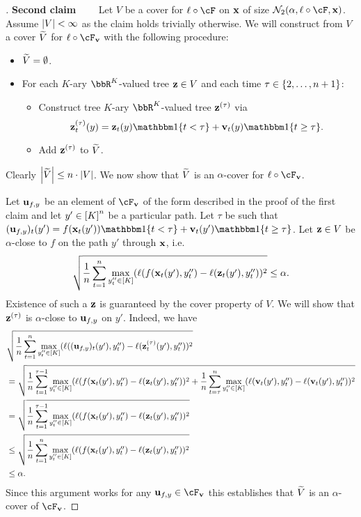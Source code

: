 \begin{proof}[]
\textbf{Second claim}~~~~
Let $V$ be a cover for $\ls\circ\cF$ on $\x$ of size $\mathcal{N}_2(\alpha,\ell \circ \cF, \x)$. Assume $\abs*{V}<\infty$ as the claim holds trivially otherwise. We will construct from $V$ a cover $\wt{V}$ for $\ls\circ\F_{\vv}$ with the following procedure:
\begin{itemize}
\item $\wt{V}=\emptyset$.
\item For each $K$-ary $\bbR^{K}$-valued tree $\zz\in{}V$ and each time $\tau\in\crl*{2,\ldots,n+1}$:
\begin{itemize}
\item Construct tree $K$-ary $\bbR^{K}$-valued tree $\zz^{(\tau)}$ via
\[
\zz^{(\tau)}_{t}(y) = \zz_{t}(y)\ind\crl*{t<\tau} + \vv_{t}(y)\ind\crl*{t\geq{}\tau}.
\]
\item Add $\zz^{(\tau)}$ to $\wt{V}$.
\end{itemize}
\end{itemize}
Clearly $\abs*{\wt{V}}\leq{}n\cdot\abs*{V}$. We now show that $\wt{V}$ is an $\alpha$-cover for $\ls\circ\cF_{\vv}$.

Let $\uu_{f,y}$ be an element of $\cF_{\vv}$ of the form described in the proof of the first claim and let $y'\in\brk*{K}^{n}$ be a particular path. Let $\tau$ be such that $(\uu_{f,y})_{t}(y') = f(\x_{t}(y'))\ind\crl*{t<\tau} + \vv_{t}(y')\ind\crl*{t\geq{}\tau}$. Let $\zz\in{}V$ be $\alpha$-close to $f$ on the path $y'$ through $\x$, i.e.
\[
\sqrt{\frac{1}{n} \sum_{t=1}^{n} \max_{y''_t\in\brk*{K}}(\ell(f(\x_{t}(y'),y''_t) - \ell(\zz_t(y'),y''_t) )^2} \leq{} \alpha.
\]
Existence of such a $\zz$ is guaranteed by the cover property of $V$. We will show that $\zz^{(\tau)}$ is $\alpha$-close to $\uu_{f,y}$ on $y'$. Indeed, we have
\begin{align*}
&\sqrt{\frac{1}{n} \sum_{t=1}^n \max_{y''_t\in\brk*{K}}(\ell((\uu_{f,y})_{t}(y'),y''_t) - \ell(\zz^{(\tau)}_t(y'),y''_t) )^2}\\
&= \sqrt{\frac{1}{n} \sum_{t=1}^{\tau-1} \max_{y''_t\in\brk*{K}}(\ell(f(\x_{t}(y'),y''_t) - \ell(\zz_{t}(y'),y''_t) )^2
+ \frac{1}{n} \sum_{t=\tau}^{n} \max_{y''_t\in\brk*{K}}(\ell(\vv_{t}(y'),y''_t) - \ell(\vv_t(y'),y''_t) )^2} \\
&= \sqrt{\frac{1}{n} \sum_{t=1}^{\tau-1} \max_{y''_t\in\brk*{K}}(\ell(f(\x_{t}(y'),y''_t) - \ell(\zz_{t}(y'),y''_t) )^2} \\
&\leq{} \sqrt{\frac{1}{n} \sum_{t=1}^{n} \max_{y''_t\in\brk*{K}}(\ell(f(\x_{t}(y'),y''_t) - \ell(\zz_{t}(y'),y''_t) )^2} \\
&\leq{} \alpha.
\end{align*}
Since this argument works for any $\uu_{f,y}\in\cF_{\vv}$ this establishes that $\wt{V}$ is an $\alpha$-cover of $\cF_{\vv}$.
\end{proof}

